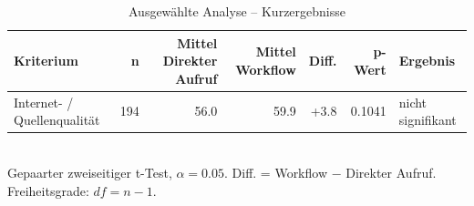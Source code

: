 \begin{table}[htbp]
\centering
\caption{Ausgewählte Analyse -- Kurzergebnisse}
\begin{tabular}{lrrrrrl}
\toprule
Kriterium & n & Mittel Direkter Aufruf & Mittel Workflow & Diff. & p-Wert & Ergebnis \\
\midrule
Internet- / Quellenqualität & 194 & 56.0 & 59.9 & +3.8 & 0.1041 & nicht signifikant \\
\bottomrule
\end{tabular}
\\[2mm]
\footnotesize Gepaarter zweiseitiger t-Test, $\alpha=0.05$. Diff. = Workflow $-$ Direkter Aufruf. Freiheitsgrade: $df=n-1$.
\end{table}
